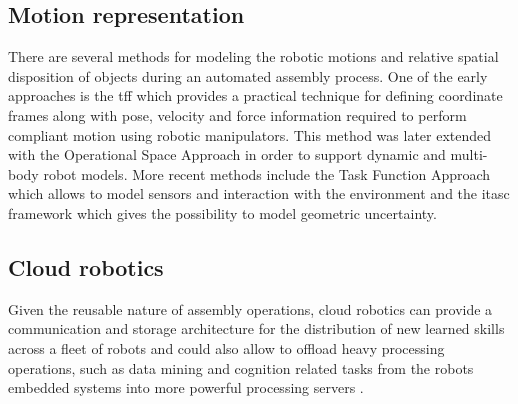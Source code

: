 \subsection{Motion representation}

There are several methods for modeling the robotic motions and relative spatial disposition of objects during an automated assembly process. One of the early approaches is the \gls{tff} \cite{Mason1981,Finkemeyer2004} which provides a practical technique for defining coordinate frames along with pose, velocity and force information required to perform compliant motion using robotic manipulators. This method was later extended with the Operational Space Approach \cite{Khatib1987,DeSapio2006} in order to support dynamic and multi-body robot models. More recent methods include the Task Function Approach \cite{Samson1991} which allows to model sensors and interaction with the environment and the \gls{itasc} framework \cite{DeSchutter-ijrr2007,Smits2010} which gives the possibility to model geometric uncertainty.


\subsection{Cloud robotics}

Given the reusable nature of assembly operations, cloud robotics can provide a communication and storage architecture for the distribution of new learned skills across a fleet of robots \cite{Tenorth2013} and could also allow to offload heavy processing operations, such as data mining \cite{Witten2005} and cognition related tasks \cite{Beetz2010,Tenorth2013k,Saxena2014,Beetz2015} from the robots embedded systems into more powerful processing servers \cite{Hunziker2013}.





